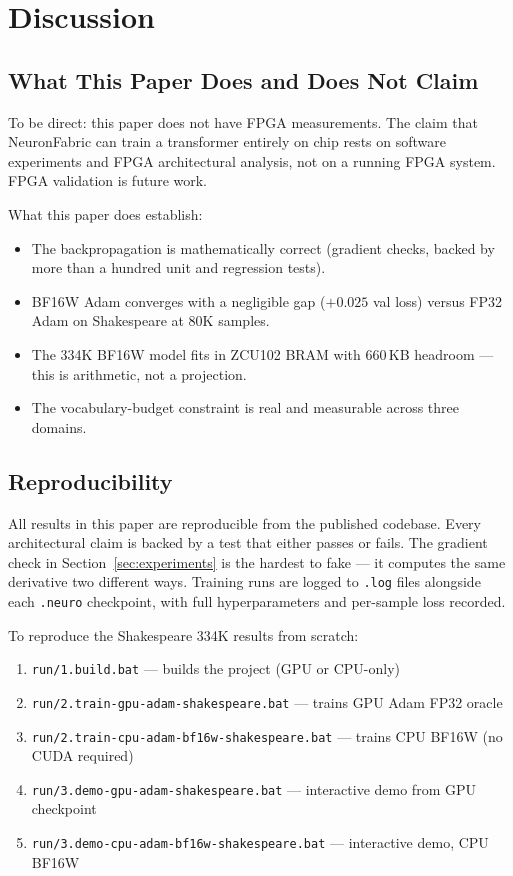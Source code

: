 \documentclass[11pt]{article}
\begin{document}
\section{Discussion}

\subsection{What This Paper Does and Does Not Claim}

To be direct: this paper does not have FPGA measurements. The claim that NeuronFabric
can train a transformer entirely on chip rests on software experiments and FPGA
architectural analysis, not on a running FPGA system. FPGA validation is future work.

What this paper does establish:

\begin{itemize}
  \item The backpropagation is mathematically correct (gradient checks, backed by more than a hundred unit and regression tests).
  \item BF16W Adam converges with a negligible gap ($+0.025$ val loss) versus FP32 Adam on Shakespeare at 80K samples.
  \item The 334K BF16W model fits in ZCU102 BRAM with 660\,KB headroom --- this is
    arithmetic, not a projection.
  \item The vocabulary-budget constraint is real and measurable across three domains.
\end{itemize}

\subsection{Reproducibility}

All results in this paper are reproducible from the published codebase.
Every architectural claim is backed by a test that either passes or fails.
The gradient check in Section~\ref{sec:experiments} is the hardest to fake ---
it computes the same derivative two different ways. Training runs are logged
to \texttt{.log} files alongside each \texttt{.neuro} checkpoint, with full
hyperparameters and per-sample loss recorded.

To reproduce the Shakespeare 334K results from scratch:
\begin{enumerate}
  \item \texttt{run/1.build.bat} --- builds the project (GPU or CPU-only)
  \item \texttt{run/2.train-gpu-adam-shakespeare.bat} --- trains GPU Adam FP32 oracle
  \item \texttt{run/2.train-cpu-adam-bf16w-shakespeare.bat} --- trains CPU BF16W (no CUDA required)
  \item \texttt{run/3.demo-gpu-adam-shakespeare.bat} --- interactive demo from GPU checkpoint
  \item \texttt{run/3.demo-cpu-adam-bf16w-shakespeare.bat} --- interactive demo, CPU BF16W
\end{enumerate}
\end{document}
